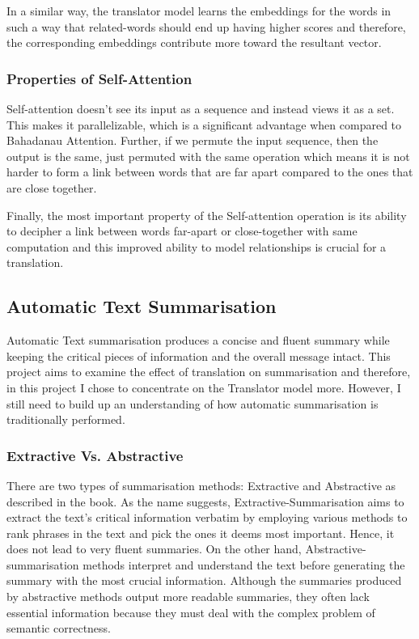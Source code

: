 \documentclass[12pt,a4paper,twoside,openright]{report}
\begin{document}
In a similar way, the translator model learns the embeddings for the words in such a way that related-words should end up having higher scores and therefore, the corresponding embeddings contribute more toward the resultant vector.

\subsubsection{Properties of Self-Attention}
Self-attention doesn't see its input as a sequence and instead views it as a set. This makes it parallelizable, which is a significant advantage when compared to Bahadanau Attention. Further, if we permute the input sequence, then the output is the same, just permuted with the same operation which means it is not harder to form a link between words that are far apart compared to the ones that are close together.%

Finally, the most important property of the Self-attention operation is its ability to decipher a link between words far-apart or close-together with same computation and this improved ability to model relationships is crucial for a translation.



\subsection{Automatic Text Summarisation}
\label{auto-text-summarisation}
Automatic Text summarisation produces a concise and fluent summary while keeping the critical pieces of information and the overall message intact. This project aims to examine the effect of translation on summarisation and therefore, in this project I chose to concentrate on the Translator model more. However, I still need to build up an understanding of how automatic summarisation is traditionally performed.

\subsubsection{Extractive Vs. Abstractive}
 There are two types of summarisation methods: Extractive and Abstractive as described in the book\cite{nlp-book}. As the name suggests, Extractive-Summarisation aims to extract the text's critical information verbatim by employing various methods to rank phrases in the text and pick the ones it deems most important. Hence, it does not lead to very fluent summaries. On the other hand, Abstractive-summarisation methods interpret and understand the text before generating the summary with the most crucial information. Although the summaries produced by abstractive methods output more readable summaries, they often lack essential information because they must deal with the complex problem of semantic correctness.
\end{document}
